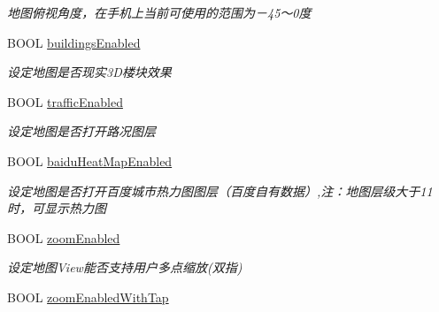 \begin{DoxyCompactItemize}
\begin{DoxyCompactList}\small\item\em 地图俯视角度，在手机上当前可使用的范围为－45～0度 \end{DoxyCompactList}\item 
\hypertarget{interface_b_m_k_map_view_abccbae8b8f7182769b8e0b69a4383ceb}{}B\+O\+O\+L \hyperlink{interface_b_m_k_map_view_abccbae8b8f7182769b8e0b69a4383ceb}{buildings\+Enabled}\label{interface_b_m_k_map_view_abccbae8b8f7182769b8e0b69a4383ceb}

\begin{DoxyCompactList}\small\item\em 设定地图是否现实3\+D楼块效果 \end{DoxyCompactList}\item 
\hypertarget{interface_b_m_k_map_view_a513d0877fb66681b10ad7a4ed1346cb7}{}B\+O\+O\+L \hyperlink{interface_b_m_k_map_view_a513d0877fb66681b10ad7a4ed1346cb7}{traffic\+Enabled}\label{interface_b_m_k_map_view_a513d0877fb66681b10ad7a4ed1346cb7}

\begin{DoxyCompactList}\small\item\em 设定地图是否打开路况图层 \end{DoxyCompactList}\item 
\hypertarget{interface_b_m_k_map_view_a9bc2c71421081064f9dbbd2a656172ff}{}B\+O\+O\+L \hyperlink{interface_b_m_k_map_view_a9bc2c71421081064f9dbbd2a656172ff}{baidu\+Heat\+Map\+Enabled}\label{interface_b_m_k_map_view_a9bc2c71421081064f9dbbd2a656172ff}

\begin{DoxyCompactList}\small\item\em 设定地图是否打开百度城市热力图图层（百度自有数据）,注：地图层级大于11时，可显示热力图 \end{DoxyCompactList}\item 
\hypertarget{interface_b_m_k_map_view_acf8472da994b76cef21a40673a41f774}{}B\+O\+O\+L \hyperlink{interface_b_m_k_map_view_acf8472da994b76cef21a40673a41f774}{zoom\+Enabled}\label{interface_b_m_k_map_view_acf8472da994b76cef21a40673a41f774}

\begin{DoxyCompactList}\small\item\em 设定地图\+View能否支持用户多点缩放(双指) \end{DoxyCompactList}\item 
\hypertarget{interface_b_m_k_map_view_a11368ac9a8b66b2bc1c3e552e368939e}{}B\+O\+O\+L \hyperlink{interface_b_m_k_map_view_a11368ac9a8b66b2bc1c3e552e368939e}{zoom\+Enabled\+With\+Tap}\label{interface_b_m_k_map_view_a11368ac9a8b66b2bc1c3e552e368939e}


\end{DoxyCompactItemize}
